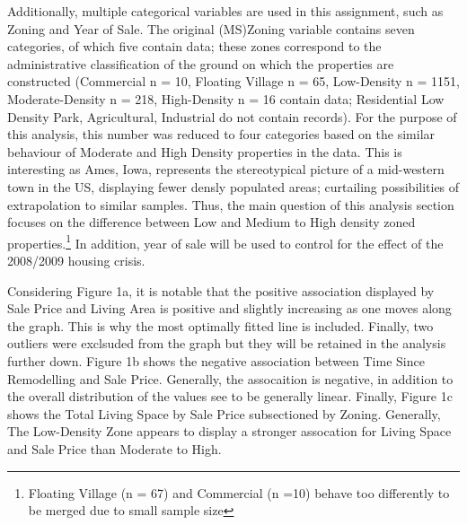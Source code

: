 \documentclass[a4paper]{article}
\begin{document}
Additionally, multiple categorical variables are used in this assignment, such as Zoning and Year of Sale. The original (MS)Zoning variable contains seven categories, of which five contain data; these zones correspond to the administrative classification of the ground on which the properties are constructed (Commercial n = 10, Floating Village n = 65, Low-Density n = 1151, Moderate-Density n = 218, High-Density n = 16 contain data; Residential Low Density Park, Agricultural, Industrial do not contain records). For the purpose of this analysis, this number was reduced to four categories based on the similar behaviour of Moderate and High Density properties in  the data. This is interesting as Ames, Iowa, represents the stereotypical picture of a mid-western town in the US, displaying fewer densly populated areas; curtailing possibilities of extrapolation to similar samples. Thus, the main question of this analysis section focuses on the difference between Low and Medium to High density zoned properties.\footnote{Floating Village (n = 67) and Commercial (n =10) behave too differently to be merged due to small sample size} In addition, year of sale will be used to control for the effect of the 2008/2009 housing crisis.




Considering Figure 1a, it is notable that the positive association displayed by Sale Price and Living Area is positive and slightly increasing as one moves along the graph. This is why the most optimally fitted line is included. Finally, two outliers were exclsuded from the graph but they will be retained in the analysis further down. Figure 1b shows the negative association between Time Since Remodelling and Sale Price. Generally, the assocaition is negative, in addition to the overall distribution of the values see to be generally linear. Finally, Figure 1c shows the Total Living Space by Sale Price subsectioned by Zoning. Generally, The Low-Density Zone appears to display a stronger assocation for Living Space and Sale Price than Moderate to High. 
\end{document}
